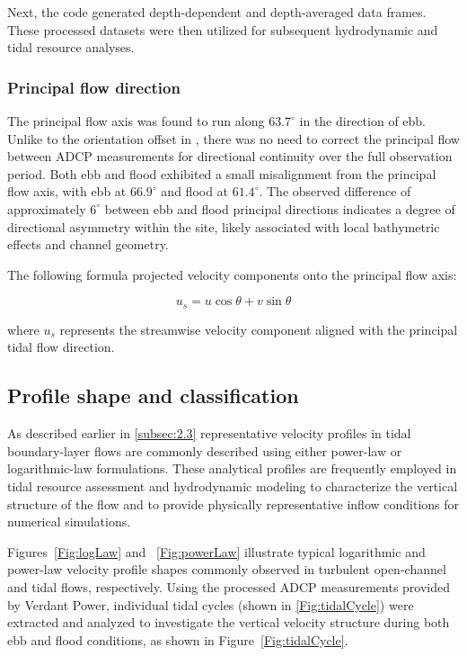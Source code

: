 \documentclass[12pt,sort&compress]{elsarticle}
\theoremstyle{definition}%
\begin{document}
Next, the code generated depth-dependent and depth-averaged data frames. These processed datasets were then utilized for subsequent hydrodynamic and tidal resource analyses.

\subsubsection{Principal flow direction}

The principal flow axis was found to run along $63.7^{\circ}$ in the direction of ebb. Unlike to the orientation offset in \citet{husoVP2026}, there was no need to correct the principal flow between ADCP measurements for directional continuity over the full observation period. Both ebb and flood exhibited a small misalignment from the principal flow axis, with ebb at $66.9^{\circ}$ and flood at $61.4^{\circ}$. The observed difference of approximately \(6^{\circ}\) between ebb and flood principal directions indicates a degree of directional asymmetry within the site, likely associated with local bathymetric effects and channel geometry.

The following formula projected velocity components onto the principal flow axis:

\[
u_s = u\cos\theta + v\sin\theta
\]

where \(u_s\) represents the streamwise velocity component aligned with the principal tidal flow direction.

\subsection{Profile shape and classification}
\label{sec:3.2}

\noindent As described earlier in \autoref{subsec:2.3} representative velocity profiles in tidal boundary-layer flows are commonly described using either power-law or logarithmic-law formulations. These analytical profiles are frequently employed in tidal resource assessment and hydrodynamic modeling to characterize the vertical structure of the flow and to provide physically representative inflow conditions for numerical simulations.

Figures~\ref{Fig:logLaw} and ~\ref{Fig:powerLaw} illustrate typical logarithmic and power-law velocity profile shapes commonly observed in turbulent open-channel and tidal flows, respectively. Using the processed ADCP measurements provided by Verdant Power, individual tidal cycles (shown in \autoref{Fig:tidalCycle}) were extracted and analyzed to investigate the vertical velocity structure during both ebb and flood conditions, as shown in Figure~\ref{Fig:tidalCycle}.
\end{document}

